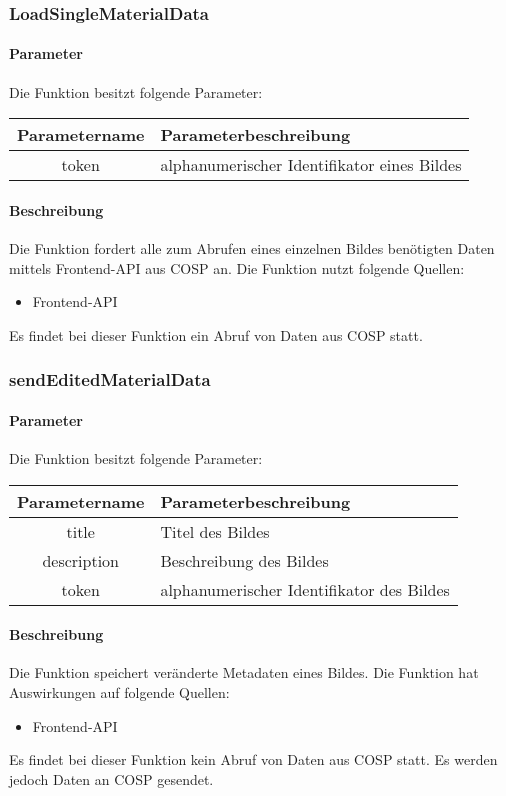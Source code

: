 \subsubsection{LoadSingleMaterialData}
\paragraph{Parameter} Die Funktion besitzt folgende Parameter:
\begin{table}[H]
	\begin{tabular}{|c|p{11cm}|}
		\hline
		\textbf{Parametername} & \textbf{Parameterbeschreibung} \\ \hline
		token & alphanumerischer Identifikator eines Bildes \\ \hline
	\end{tabular}
\end{table}
\paragraph{Beschreibung} Die Funktion fordert alle zum Abrufen eines einzelnen Bildes benötigten Daten mittels Frontend-API aus {\glqq COSP\grqq} an. Die Funktion nutzt folgende Quellen:
\begin{itemize}
	\item Frontend-API
\end{itemize}
Es findet bei dieser Funktion ein Abruf von Daten aus {\glqq COSP\grqq} statt.
\subsubsection{sendEditedMaterialData}
\paragraph{Parameter} Die Funktion besitzt folgende Parameter:
\begin{table}[H]
	\begin{tabular}{|c|p{11cm}|}
		\hline
		\textbf{Parametername} & \textbf{Parameterbeschreibung} \\ \hline
		title       & Titel des Bildes \\ \hline
		description & Beschreibung des Bildes \\ \hline
		token       & alphanumerischer Identifikator des Bildes \\ \hline
	\end{tabular}
\end{table}
\paragraph{Beschreibung} Die Funktion speichert veränderte Metadaten eines Bildes. Die Funktion hat Auswirkungen auf folgende Quellen:
\begin{itemize}
	\item Frontend-API
\end{itemize}
Es findet bei dieser Funktion kein Abruf von Daten aus {\glqq COSP\grqq} statt. Es werden jedoch Daten an {\glqq COSP\grqq} gesendet.

